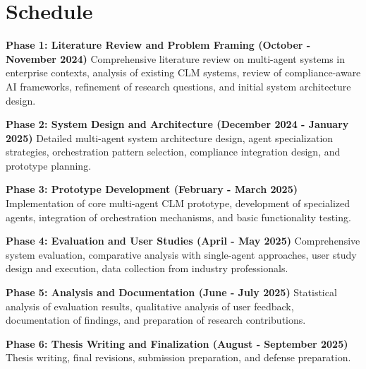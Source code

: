 
\section{Schedule}\label{section:schedule}

\textbf{Phase 1: Literature Review and Problem Framing (October - November 2024)}
Comprehensive literature review on multi-agent systems in enterprise contexts, analysis of existing CLM systems, review of compliance-aware AI frameworks, refinement of research questions, and initial system architecture design.

\textbf{Phase 2: System Design and Architecture (December 2024 - January 2025)}
Detailed multi-agent system architecture design, agent specialization strategies, orchestration pattern selection, compliance integration design, and prototype planning.

\textbf{Phase 3: Prototype Development (February - March 2025)}
Implementation of core multi-agent CLM prototype, development of specialized agents, integration of orchestration mechanisms, and basic functionality testing.

\textbf{Phase 4: Evaluation and User Studies (April - May 2025)}
Comprehensive system evaluation, comparative analysis with single-agent approaches, user study design and execution, data collection from industry professionals.

\textbf{Phase 5: Analysis and Documentation (June - July 2025)}
Statistical analysis of evaluation results, qualitative analysis of user feedback, documentation of findings, and preparation of research contributions.

\textbf{Phase 6: Thesis Writing and Finalization (August - September 2025)}
Thesis writing, final revisions, submission preparation, and defense preparation.
